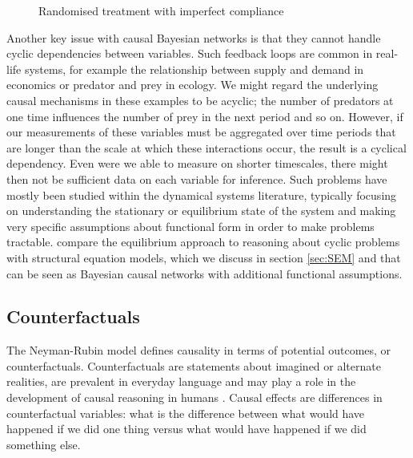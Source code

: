 \documentclass[11pt,a4paper,twoside]{report}
\theoremstyle{plain}
\theoremstyle{definition}
\begin{document}
\begin{figure}[ht]
\centering
{}
\caption{Randomised treatment with imperfect compliance}
\label{fig:randomized_imperfect_compliance}
\end{figure}

Another key issue with causal Bayesian networks is that they cannot handle cyclic dependencies between variables. Such feedback loops are common in real-life systems, for example the relationship between supply and demand in economics or predator and prey in ecology. We might regard the underlying causal mechanisms in these examples to be acyclic; the number of predators at one time influences the number of prey in the next period and so on. However, if our measurements of these variables must be aggregated over time periods that are longer than the scale at which these interactions occur, the result is a cyclical dependency. Even were we able to measure on shorter timescales, there might then not be sufficient data on each variable for inference. Such problems have mostly been studied within the dynamical systems literature, typically focusing on understanding the stationary or equilibrium state of the system and making very specific assumptions about functional form in order to make problems tractable. \citet{Poole2013} compare the equilibrium approach to reasoning about cyclic problems with structural equation models, which we discuss in section \ref{sec:SEM} and that can be seen as Bayesian causal networks with additional functional assumptions. 

\subsection{Counterfactuals}
\label{sec:counterfactuals}

The Neyman-Rubin model \citep{Rubin1974,Rubin1978,Rosenbaum1983, Rubin2005,Rubin2008} defines causality in terms of potential outcomes, or counterfactuals. Counterfactuals are statements about imagined or alternate realities, are prevalent in everyday language and may play a role in the development of causal reasoning in humans \citep{Weisberg2013}. Causal effects are differences in counterfactual variables: what is the difference between what would have happened if we did one thing versus what would have happened if we did something else. 
\end{document}
